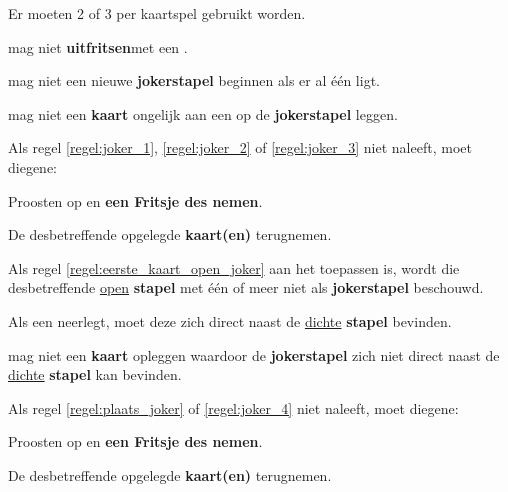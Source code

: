 \vervolgLijst{}
\item Er moeten 2 of 3 \footnotemark[1] per kaartspel gebruikt worden.
\eindLijst{}

\vervolgLijst{}
\item \EenSpeler mag niet \textbf{uitfritsen}\footnotemark[2] met een \footnotemark[1].
\label{regel:joker_1}
\eindLijst{}

\vervolgLijst{}
\item \EenSpeler mag niet een nieuwe \textbf{jokerstapel} beginnen als er al \'e\'en ligt.
\label{regel:joker_2}
\eindLijst{}

\vervolgLijst{}
\item \EenSpeler mag niet een \textbf{kaart} ongelijk aan een \footnotemark[1] op de \textbf{jokerstapel} leggen.
\label{regel:joker_3}
\eindLijst{}

\vervolgLijst{}
\item Als \eenSpeler regel \ref{regel:joker_1}, \ref{regel:joker_2} of \ref{regel:joker_3} niet naleeft, moet diegene:
\puntLijst{}
\item Proosten op  en \textbf{een Fritsje des nemen}\footnotemark[3].
\item De desbetreffende opgelegde \textbf{kaart(en)} terugnemen.
\eindPuntLijst{}
\label{regel:kaarten_terugnemen_3}
\eindLijst{}

\vervolgLijst{}
\item Als \Frits regel \ref{regel:eerste_kaart_open_joker} aan het toepassen is, wordt die desbetreffende \ul{open} \textbf{stapel} met \'e\'en of meer  niet als \textbf{jokerstapel} beschouwd.
\eindLijst{}


\vervolgLijst{}
\item Als \eenSpeler een \footnotemark[1] neerlegt, moet deze zich direct naast de \ul{dichte} \textbf{stapel} bevinden.
\label{regel:plaats_joker}
\eindLijst{}

\vervolgLijst{}
\item \EenSpeler mag niet een \textbf{kaart} opleggen waardoor de \textbf{jokerstapel} zich niet direct naast de \ul{dichte} \textbf{stapel} kan bevinden.
\label{regel:joker_4}
\eindLijst{}

\vervolgLijst{}
\item Als \eenSpeler regel \ref{regel:plaats_joker} of \ref{regel:joker_4} niet naleeft, moet diegene:
\puntLijst{}
\item Proosten op  en \textbf{een Fritsje des nemen}\footnotemark[3].
\item De desbetreffende opgelegde \textbf{kaart(en)} terugnemen.
\eindPuntLijst{}
\label{regel:kaarten_terugnemen_4}
\eindLijst{}

